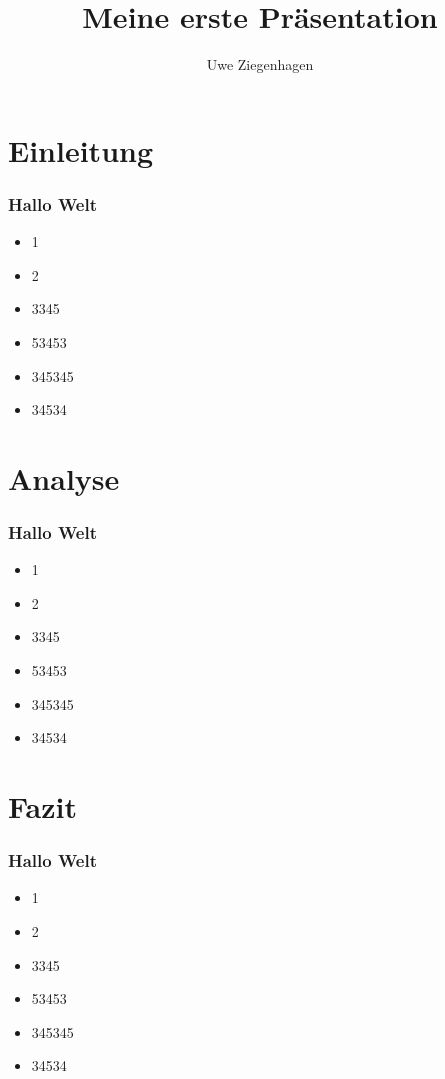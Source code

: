 \documentclass[12pt,ngerman,aspectratio=169]{beamer}
\author{Uwe Ziegenhagen}
\title{Meine erste Präsentation}
\begin{document}
\begin{frame}
\maketitle
\end{frame}

\begin{frame}
\tableofcontents
\end{frame}


\section{Einleitung}

\begin{frame}
\frametitle{Hallo Welt}

\begin{itemize}
\item 1
\item 2
\item 3345
\item 53453
\item 345345
\item 34534
\end{itemize}
\end{frame}


\section{Analyse}

\begin{frame}
\frametitle{Hallo Welt}

\begin{itemize}
\item 1
\item 2
\item 3345
\item 53453
\item 345345
\item 34534
\end{itemize}
\end{frame}



\section{Fazit}

\begin{frame}
\frametitle{Hallo Welt}

\begin{itemize}
\item 1
\item 2
\item 3345
\item 53453
\item 345345
\item 34534
\end{itemize}
\end{frame}
\end{document}
